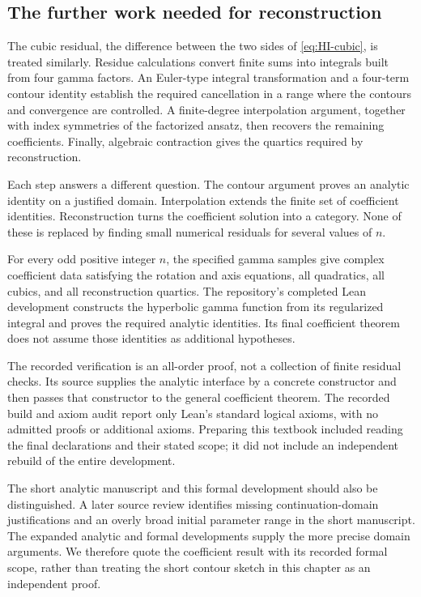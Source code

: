 \subsection{The further work needed for reconstruction}

The cubic residual, the difference between the two sides of
\eqref{eq:HI-cubic}, is treated similarly.  Residue calculations
convert finite sums into integrals built from four gamma factors.
An Euler-type integral transformation and a four-term contour
identity establish the required cancellation in a range where the
contours and convergence are controlled.  A finite-degree
interpolation argument, together with index symmetries of the
factorized ansatz, then recovers the remaining coefficients.
Finally, algebraic contraction gives the quartics required by
reconstruction.

Each step answers a different question.  The contour argument proves
an analytic identity on a justified domain.  Interpolation extends
the finite set of coefficient identities.  Reconstruction turns the
coefficient solution into a category.  None of these is replaced
by finding small numerical residuals for several values of $n$.

\begin{constructioninput}
For every odd positive integer $n$, the specified gamma samples give
complex coefficient data satisfying the rotation and axis equations,
all quadratics, all cubics, and all reconstruction quartics. The
repository's completed Lean development constructs the hyperbolic
gamma function from its regularized integral and proves the required
analytic identities. Its final coefficient theorem does not assume
those identities as additional hypotheses.
\end{constructioninput}

The recorded verification is an all-order proof, not a collection
of finite residual checks. Its source supplies the analytic
interface by a concrete constructor and then passes that constructor
to the general coefficient theorem. The recorded build and axiom
audit report only Lean's standard logical axioms, with no admitted
proofs or additional axioms. Preparing this textbook included reading
the final declarations and their stated scope; it did not include
an independent rebuild of the entire development.

The short analytic manuscript and this formal development should
also be distinguished. A later source review identifies missing
continuation-domain justifications and an overly broad initial
parameter range in the short manuscript. The expanded analytic and
formal developments supply the more precise domain arguments.
We therefore quote the coefficient result with its recorded formal
scope, rather than treating the short contour sketch in this chapter
as an independent proof.

